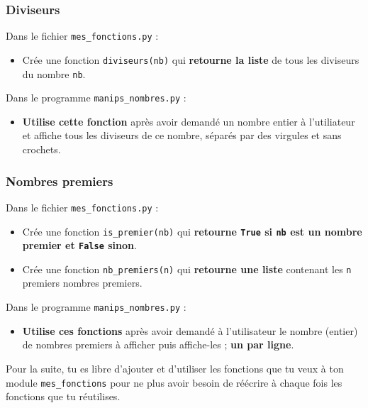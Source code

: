 \documentclass[11pt]{article}
\begin{document}
\subsubsection*{Diviseurs}
\label{sec:org35a8784}
Dans le fichier \texttt{mes\_fonctions.py} :
\begin{itemize}
\item Crée une fonction \texttt{diviseurs(nb)} qui \textbf{retourne la liste} de tous les diviseurs du nombre \texttt{nb}.
\end{itemize}
Dans le programme \texttt{manips\_nombres.py} :
\begin{itemize}
\item \textbf{Utilise cette fonction} après avoir demandé un nombre entier à l'utiliateur et affiche tous les diviseurs de ce nombre, séparés par des virgules et sans crochets.
\end{itemize}

\subsubsection*{Nombres premiers}
\label{sec:orgfa01db0}
Dans le fichier \texttt{mes\_fonctions.py} :
\begin{itemize}
\item Crée une fonction \texttt{is\_premier(nb)} qui \textbf{retourne \texttt{True} si \texttt{nb} est un nombre premier et \texttt{False} sinon}.
\item Crée une fonction \texttt{nb\_premiers(n)} qui \textbf{retourne une liste} contenant les \texttt{n} premiers nombres premiers.
\end{itemize}
Dans le programme \texttt{manips\_nombres.py} :
\begin{itemize}
\item \textbf{Utilise ces fonctions} après avoir demandé à l'utilisateur le nombre (entier) de nombres premiers à afficher puis affiche-les ; \textbf{un par ligne}.
\end{itemize}

Pour la suite, tu es libre d'ajouter et d'utiliser les fonctions que tu veux à ton module \texttt{mes\_fonctions} pour ne plus avoir besoin de réécrire à chaque fois les fonctions que tu réutilises.
\end{document}
